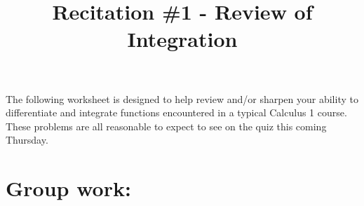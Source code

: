 \documentclass[]{ximera}
\title{Recitation \#1 - Review of Integration}
\begin{document}
\begin{abstract}		\end{abstract}
\maketitle



The following worksheet is designed to help review and/or sharpen your ability to differentiate and integrate functions encountered in a typical Calculus 1 course.  These problems are all reasonable to expect to see on the quiz this coming Thursday.


\section{Group work:}
\end{document}
